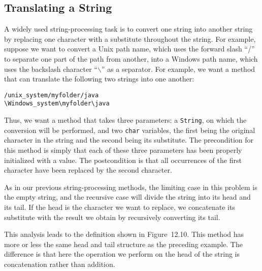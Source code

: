 \subsection{Translating a String}
\noindent A widely used string-processing task is to convert one string into
another string by replacing one character with a substitute throughout
the string.  For example, suppose we want to convert a Unix path name,
which uses the forward slash ``/'' to separate one part of the path from
another, into a Windows path name, which uses the backslash character
``$\backslash$'' as a separator.   For example, we want a method
that can translate the following two strings into one another:

\begin{jjjlisting}
\begin{lstlisting}
/unix_system/myfolder/java
\Windows_system\myfolder\java
\end{lstlisting}
\end{jjjlisting}

Thus, we want a method that takes three parameters: a {\tt String},
on which the conversion will be performed, and two {\tt char}
variables, the first being the original character in the string and
the second being its substitute.   The precondition for this method is
simply that each of these three parameters has been properly
initialized with a value.  The postcondition is that all occurrences of
the first character have been replaced by the second character.

As in our previous
string-processing methods, the limiting case in
this problem is the empty string, and the recursive case will divide
the string into its head and its tail.  If the head is the character we
want to replace, we concatenate its substitute with the result we
obtain by recursively converting its tail.


This analysis leads to the definition shown in
Figure~12.10. This method has more or less the same head
and tail structure as the preceding example.  The difference is that
here the operation we perform on the head of the string is
concatenation rather than addition.

